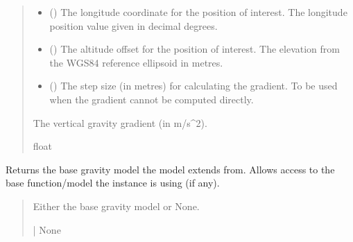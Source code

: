\documentclass[letterpaper,10pt,english]{sphinxmanual}
\begin{document}
\begin{fulllineitems}
\begin{fulllineitems}
\begin{quote}
\begin{description}
\begin{itemize}
\item {} 
\sphinxAtStartPar
{} () \textendash{} The longitude coordinate for the position of interest.
The longitude position value given in decimal degrees.

\item {} 
\sphinxAtStartPar
{} () \textendash{} The altitude offset for the position of interest.
The elevation from the WGS\sphinxhyphen{}84 reference ellipsoid in metres.

\item {} 
\sphinxAtStartPar
{} () \textendash{} The step size (in metres) for calculating the gradient.
To be used when the gradient cannot be computed directly.

\end{itemize}

\sphinxAtStartPar
The vertical gravity gradient (in m/s\textasciicircum{}2).

\sphinxAtStartPar
float

\end{description}\end{quote}

\end{fulllineitems}


\begin{fulllineitems}
\label{\detokenize{modules/gravity/base:qnav.gravity.base.GravityModel.base_model}}
\pysigstartsignatures
{}
\pysigstopsignatures
\sphinxAtStartPar
Returns the base gravity model the model extends from.
Allows access to the base function/model the instance is
using (if any).
\begin{quote}\begin{description}
\sphinxAtStartPar
Either the base gravity model or None.

\sphinxAtStartPar
{\hyperref[\detokenize{modules/gravity/base:qnav.gravity.base.GravityModel}]{}} | None

\end{description}\end{quote}

\end{fulllineitems}


\end{fulllineitems}
\end{document}
